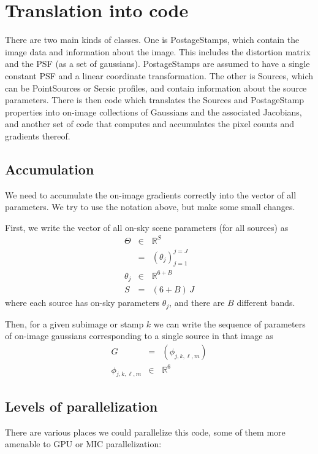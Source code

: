 \documentclass[modern]{aastex62}
\begin{document}
{\section{Translation into code}
There are two main kinds of classes.
One is PostageStamps, which contain the image data and information about the image.
This includes the distortion matrix and the PSF (as a set of gaussians).
PostageStamps are assumed to have a single constant PSF and a linear coordinate transformation.
 The other is Sources, which can be PointSources or Sersic profiles, and contain information about the source parameters.
There is then code which translates the Sources and PostageStamp properties into on-image collections of Gaussians and the associated Jacobians, 
and another set of code that computes and accumulates the pixel counts and gradients thereof.



\subsection{Accumulation}
We need to accumulate the on-image gradients correctly into the vector of all parameters. 
We try to use the notation above, but make some small changes.

First, we write the vector of all on-sky scene parameters (for all sources) as 
\begin{eqnarray}
\Theta & \in & \mathbb{R}^{S} \\
 & = & (\theta_j)_{j=1}^{j=J} \\
\theta_j & \in & \mathbb{R}^{6+B} \\
S & = & (6 + B) \, J
\end{eqnarray}
where each source has on-sky parameters $\theta_j$, and there are $B$ different bands.

Then, for a given subimage or stamp $k$ we can write the sequence of parameters of on-image gaussians corresponding to a single source in that image as 
\begin{eqnarray}
G & = & (\phi_{j, k, \ell, m}) \\
\phi_{j, k, \ell, m} & \in & \mathbb{R}^{6}
\end{eqnarray}


\subsection{Levels of parallelization}
There are various places we could parallelize this code, 
some of them more amenable to GPU or MIC parallelization:
\begin{itemize}


\end{itemize}}
\end{document}
